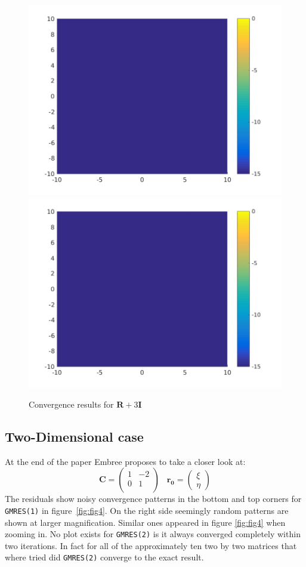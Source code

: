 \begin{figure}
\centering
\includegraphics[width=0.45\linewidth]{../src/figure/randAp3eyeGMRES2}
\includegraphics[width=0.45\linewidth]{../src/figure/randAp3eyeGMRES2}
\caption{Convergence results for $\mathbf{R} + 3\mathbf{I}$}
\label{fig:randAp3eyeGMRES2}
\end{figure}

\subsection{Two-Dimensional case}
At the end of the paper Embree proposes to take a closer look at:
\begin{equation}
\mathbf{C} = \begin{pmatrix}
1 & -2 \\
0 & 1 \\
\end{pmatrix}
\;\;\;
\mathbf{r_0} = \begin{pmatrix} \xi \\ \eta \end{pmatrix}
\end{equation}
The residuals show noisy convergence patterns in the bottom and top corners for \texttt{GMRES(1)} in figure~\ref{fig:fig4}. On the right side seemingly random patterns are shown at larger magnification.
Similar ones appeared in figure \ref{fig:fig4} when zooming in. No plot exists for \texttt{GMRES(2)} is it always converged completely within two iterations. In fact for all of the approximately ten two by two matrices that where tried did \texttt{GMRES(2)} converge to the exact result.

